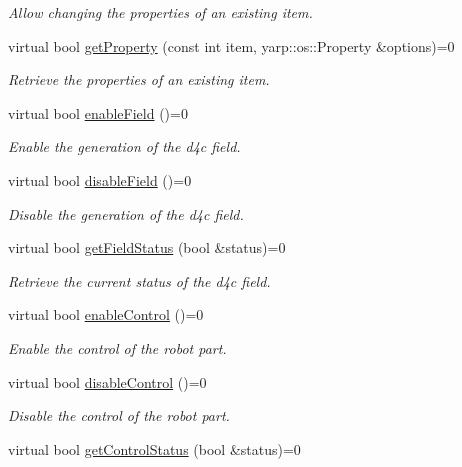 \begin{DoxyCompactItemize}
\begin{DoxyCompactList}\small\item\em Allow changing the properties of an existing item. \end{DoxyCompactList}\item 
virtual bool \hyperlink{classiCub_1_1d4c_1_1D4C_a6d9a79974f82e5447b62ce988ddac97c}{get\+Property} (const int item, yarp\+::os\+::\+Property \&options)=0
\begin{DoxyCompactList}\small\item\em Retrieve the properties of an existing item. \end{DoxyCompactList}\item 
virtual bool \hyperlink{classiCub_1_1d4c_1_1D4C_a45e42c71e94db9285f8ceea5ac31070a}{enable\+Field} ()=0
\begin{DoxyCompactList}\small\item\em Enable the generation of the d4c field. \end{DoxyCompactList}\item 
virtual bool \hyperlink{classiCub_1_1d4c_1_1D4C_ac33e94206a98fa9f4cd4151e251f050e}{disable\+Field} ()=0
\begin{DoxyCompactList}\small\item\em Disable the generation of the d4c field. \end{DoxyCompactList}\item 
virtual bool \hyperlink{classiCub_1_1d4c_1_1D4C_abd5f01a0fbb06b5e6fd034ed0dc65873}{get\+Field\+Status} (bool \&status)=0
\begin{DoxyCompactList}\small\item\em Retrieve the current status of the d4c field. \end{DoxyCompactList}\item 
virtual bool \hyperlink{classiCub_1_1d4c_1_1D4C_a47d6b5e69fb5d56e4a34680d492cc830}{enable\+Control} ()=0
\begin{DoxyCompactList}\small\item\em Enable the control of the robot part. \end{DoxyCompactList}\item 
virtual bool \hyperlink{classiCub_1_1d4c_1_1D4C_aa2b70621e2053127c25c00400b937231}{disable\+Control} ()=0
\begin{DoxyCompactList}\small\item\em Disable the control of the robot part. \end{DoxyCompactList}\item 
virtual bool \hyperlink{classiCub_1_1d4c_1_1D4C_a00f45d51ca6bd89bb660db4520806b4b}{get\+Control\+Status} (bool \&status)=0

\end{DoxyCompactItemize}
